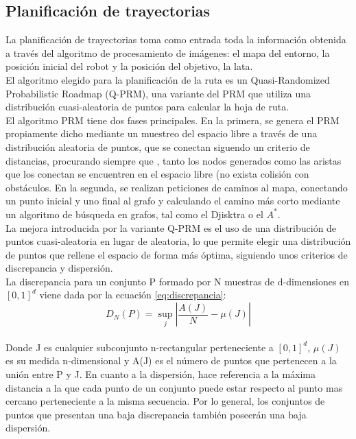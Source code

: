 \subsection{Planificación de trayectorias}
\label{planificacion}

La planificación de trayectorias toma como entrada toda la información obtenida a través del algoritmo de procesamiento de imágenes: el mapa del entorno, la posición inicial del robot y la posición del objetivo, la lata.\\

El algoritmo elegido para la planificación de la ruta es un Quasi-Randomized Probabilistic Roadmap (Q-PRM), una variante del PRM que utiliza una distribución cuasi-aleatoria de puntos para calcular la hoja de ruta.\\

El algoritmo PRM tiene dos fases principales. En la primera, se genera el PRM propiamente dicho mediante un muestreo del espacio libre a través de una distribución aleatoria de puntos, que se conectan siguendo un criterio de distancias, procurando siempre que , tanto los nodos generados como las aristas que los conectan se encuentren en el espacio libre (no exista colisión con obstáculos. En la segunda, se realizan peticiones de caminos al mapa, conectando un punto inicial y uno final al grafo y calculando el camino más corto mediante un algoritmo de búsqueda en grafos, tal como el Djisktra o el $A^*$.\\

La mejora introducida por la variante Q-PRM es el uso de una distribución de puntos cuasi-aleatoria en lugar de aleatoria, lo que permite elegir una distribución de puntos que rellene el espacio de forma más óptima, siguiendo unos criterios de discrepancia y dispersión. \\

La discrepancia para un conjunto P formado por N muestras de d-dimensiones en $[0,1]^{d}$  viene dada por la ecuación \ref{eq:discrepancia}:
\begin{equation}
\label{eq:discrepancia}
D_N(P) = \sup_{j}{\left| \frac{A(J)}{N} -  \mu(J) \right| }
\end{equation}~\\

Donde J es cualquier subconjunto n-rectangular perteneciente a $[0,1]^{d}$, $\mu(J)$ es su medida n-dimensional y A(J) es el número de puntos que pertenecen a la unión entre P y J. En cuanto a la dispersión, hace referencia a la máxima distancia a la que cada punto de un conjunto puede estar respecto al punto mas cercano perteneciente a la misma secuencia. Por lo general, los conjuntos de puntos que presentan una baja discrepancia también poseerán una baja dispersión.\\


